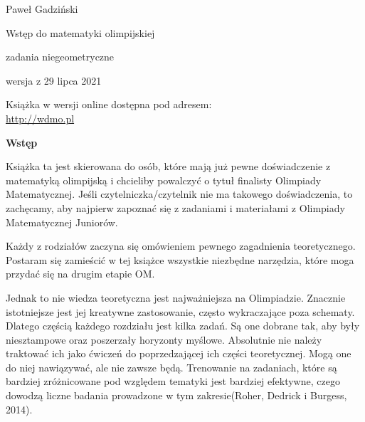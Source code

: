 \thispagestyle{empty}\addtocounter{page}{-1}
	\begin{center}
		\fontsize{15}{15}\selectfont
		Paweł Gadziński

		\vspace{50px}

		\fontsize{40}{40}\selectfont
		\textcolor{kolor}{Wstęp do matematyki olimpijskiej}

		\vspace{20px}

		\fontsize{25}{25}\selectfont
		\textcolor{kolor}{zadania niegeometryczne}

		\vspace{40px}

		\fontsize{15}{15}\selectfont
		wersja z 29 lipca 2021
	\end{center}
\vspace*{\fill}
\begin{center}
		\fontsize{15}{15}\selectfont
		Książka w wersji online dostępna pod adresem: \\
		\url{http://wdmo.pl}
\end{center}
\newpage
	\vspace*{\fill}
	\begin{center}
		\fontsize{20}{20}\selectfont
		\textbf{Wstęp}
		\vspace{30px}
	\end{center}
		\noindent
		Książka ta jest skierowana do osób, które mają już pewne doświadczenie z matematyką olimpijską i chcieliby powalczyć o tytuł finalisty Olimpiady Matematycznej. Jeśli czytelniczka/czytelnik nie ma takowego doświadczenia, to zachęcamy, aby najpierw zapoznać się z zadaniami i materiałami z Olimpiady Matematycznej Juniorów.

		\vspace{10px}
		\noindent
		Każdy z rodziałów zaczyna się omówieniem pewnego zagadnienia teoretycznego. Postaram się zamieścić w tej książce wszystkie niezbędne narzędzia, które moga przydać się na drugim etapie OM. 

		\vspace{10px}
		\noindent
		Jednak to nie wiedza teoretyczna jest najważniejsza na Olimpiadzie. Znacznie istotniejsze jest jej kreatywne zastosowanie, często wykraczające poza schematy. Dlatego częścią każdego rozdziału jest kilka zadań. Są one dobrane tak, aby były niesztampowe oraz poszerzały horyzonty myślowe. Absolutnie nie należy traktować ich jako ćwiczeń do poprzedzającej ich części teoretycznej. Mogą one do niej nawiązywać, ale nie zawsze będą. Trenowanie na zadaniach, które są bardziej zróżnicowane pod względem tematyki jest bardziej efektywne, czego dowodzą liczne badania prowadzone w tym zakresie(Roher, Dedrick i Burgess, 2014). 

